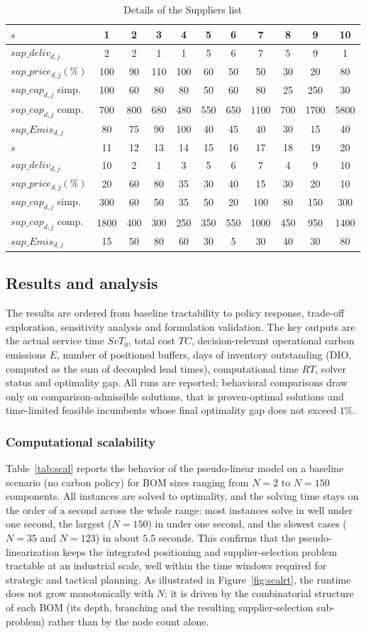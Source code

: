 \documentclass[preprint,12pt,authoryear]{elsarticle}
\begin{document}
\begin{table}[t]\centering\scriptsize
\setlength{\tabcolsep}{3pt}
\begin{center}
\caption{Details of the Suppliers list}
\label{tab:suppdet2}
 \begin{tabular}{lcccccccccc}
 \toprule
 $s$ & 1&2&3&4&5&6&7&8&9&10\tabularnewline
 \midrule
 $sup\_deliv_{d,j}$ & 2&2&1&1&5&6&7&5&9&1\tabularnewline
 $sup\_price_{d,j} (\%)$ & 100&90&110&100&60&50&50&30&20&80\tabularnewline
 $sup\_cap_{d,j}$ simp.&100&60&80&80&50&60&80&25&250&30 \tabularnewline
 $sup\_cap_{d,j}$ comp.&700&800&680&480&550&650&1100&700&1700&5800 \tabularnewline
 $sup\_Emis_{d,j}$ & 80&75&90&100&40&45&40&30&15&40\tabularnewline
 \midrule\midrule
 $s$ &11&12&13&14&15&16&17&18&19&20\tabularnewline
 \midrule
 $sup\_deliv_{d,j}$&10&2&1&3&5&6&7&4&9&10\tabularnewline
 $sup\_price_{d,j} (\%)$ &20&60&80&35&30&40&15&30&20&10\tabularnewline
 $sup\_cap_{d,j}$ simp.&300&60&50&35&50&20&100&80&150&300 \tabularnewline
 $sup\_cap_{d,j}$ comp. &1800&400&300&250&350&550&1000&450&950&1400 \tabularnewline
 $sup\_Emis_{d,j}$ & 15&50&80&60&30&5&30&40&30&80\tabularnewline
\bottomrule
\end{tabular}
\end{center}
\end{table}

\subsection{Results and analysis}
The results are ordered from baseline tractability to policy response, trade-off exploration, sensitivity analysis and formulation validation. The key outputs are the actual service time $SvT_{0}$, total cost $TC$, decision-relevant operational carbon emissions $E$, number of positioned buffers, days of inventory outstanding (DIO, computed as the sum of decoupled lead times), computational time $RT$, solver status and optimality gap. All runs are reported; behavioral comparisons draw only on comparison-admissible solutions, that is proven-optimal solutions and time-limited feasible incumbents whose final optimality gap does not exceed $1\%$.

\subsubsection{Computational scalability}
Table~\ref{tab:scal} reports the behavior of the pseudo-linear model on a baseline scenario (no carbon policy) for BOM sizes ranging from $N=2$ to $N=150$ components. All instances are solved to optimality, and the solving time stays on the order of a second across the whole range: most instances solve in well under one second, the largest ($N=150$) in under one second, and the slowest cases ($N=35$ and $N=123$) in about $5.5$ seconds. This confirms that the pseudo-linearization keeps the integrated positioning and supplier-selection problem tractable at an industrial scale, well within the time windows required for strategic and tactical planning. As illustrated in Figure~\ref{fig:scalrt}, the runtime does not grow monotonically with $N$: it is driven by the combinatorial structure of each BOM (its depth, branching and the resulting supplier-selection sub-problem) rather than by the node count alone.
\end{document}
